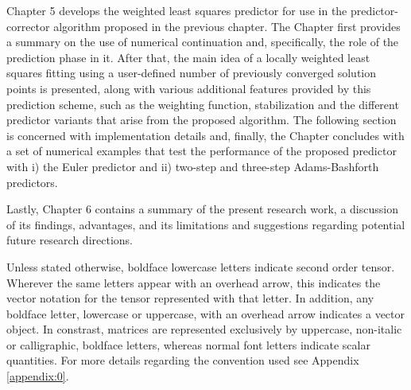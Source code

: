 Chapter 5 develops the weighted least squares predictor for use in the 
predictor-corrector algorithm proposed in the previous chapter. The Chapter first 
provides a summary on the use of numerical continuation and, specifically, the role of 
the prediction phase in it. After that, the main idea of a locally weighted 
least squares 
fitting using a user-defined number of previously converged solution points is 
presented, along with various additional features provided by this prediction scheme, 
such as the weighting function, stabilization and the different predictor variants 
that arise from the proposed algorithm. The following section is concerned with 
implementation details and, finally, the Chapter concludes with a set of numerical 
examples that test the performance of the proposed predictor with i) the Euler 
predictor and ii) two-step and three-step Adams-Bashforth predictors. 

Lastly, Chapter 6 contains a summary of the present research work, a discussion of its 
findings, advantages, and its limitations and suggestions regarding potential 
future 
research directions.

 
Unless stated otherwise, boldface lowercase letters indicate second order 
tensor. Wherever 
the same letters appear with an overhead arrow, this indicates the vector 
notation for the tensor represented with that letter.
In addition, any boldface letter, lowercase or uppercase, with an overhead 
arrow indicates a vector object. In constrast, matrices are represented 
exclusively by uppercase, non-italic or calligraphic, boldface letters,
whereas normal font letters indicate scalar quantities.  For more details 
regarding the convention used see Appendix \ref{appendix:0}.





